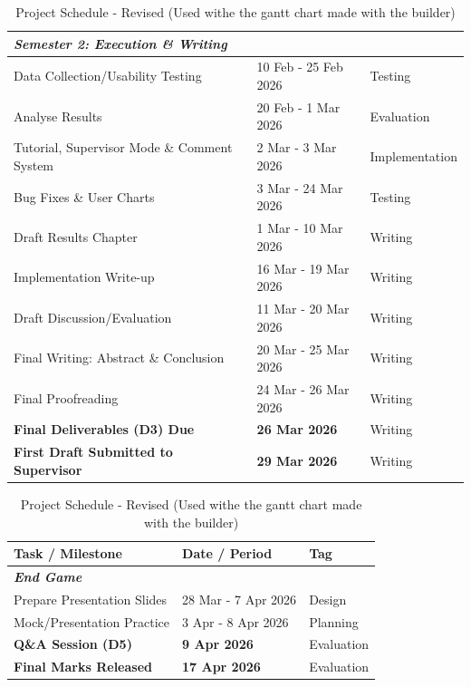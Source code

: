 \documentclass[12pt,nonacm,acmlarge,titlepage,screen]{acmart}
\begin{document}
\begin{table}[htbp]
\begin{tabularx}{\textwidth}{| X | l | l |}
        \multicolumn{3}{|l|}{\textit{\textbf{Semester 2: Execution \& Writing}}} \\
        \hline
        Data Collection/Usability Testing & 10 Feb - 25 Feb 2026 & Testing \\
        \hline
        Analyse Results & 20 Feb - 1 Mar 2026 & Evaluation \\
        \hline
        Tutorial, Supervisor Mode \& Comment System & 2 Mar - 3 Mar 2026 & Implementation \\
        \hline
        Bug Fixes \& User Charts & 3 Mar - 24 Mar 2026 & Testing \\
        \hline
        Draft Results Chapter & 1 Mar - 10 Mar 2026 & Writing \\
        \hline
        Implementation Write-up & 16 Mar - 19 Mar 2026 & Writing \\
        \hline
        Draft Discussion/Evaluation & 11 Mar - 20 Mar 2026 & Writing \\
        \hline
        Final Writing: Abstract \& Conclusion & 20 Mar - 25 Mar 2026 & Writing \\
        \hline
        Final Proofreading & 24 Mar - 26 Mar 2026 & Writing \\
        \hline
        \textbf{Final Deliverables (D3) Due} & \textbf{26 Mar 2026} & Writing \\
        \hline
        \textbf{First Draft Submitted to Supervisor} & \textbf{29 Mar 2026} & Writing \\
        \hline
        
    \end{tabularx}
    \caption{Project Schedule - Revised (Used withe the gantt chart made with the builder)}
    \label{tab:schedule}
\end{table}


\begin{table}[htbp]
    \centering
    \small
    \renewcommand{\arraystretch}{1.3}
    
    \begin{tabularx}{\textwidth}{| X | l | l |}
        \hline
        \textbf{Task / Milestone} & \textbf{Date / Period} & \textbf{Tag} \\
        \hline

        \multicolumn{3}{|l|}{\textit{\textbf{End Game}}} \\
        \hline
        Prepare Presentation Slides & 28 Mar - 7 Apr 2026 & Design \\
        \hline
        Mock/Presentation Practice & 3 Apr - 8 Apr 2026 & Planning \\
        \hline
        \textbf{Q\&A Session (D5)} & \textbf{9 Apr 2026} & Evaluation \\
        \hline
        \textbf{Final Marks Released} & \textbf{17 Apr 2026} & Evaluation \\
        \hline
        
    \end{tabularx}
    \caption{Project Schedule - Revised (Used withe the gantt chart made with the builder)}
    \label{tab:schedule}
\end{table}
\end{document}
